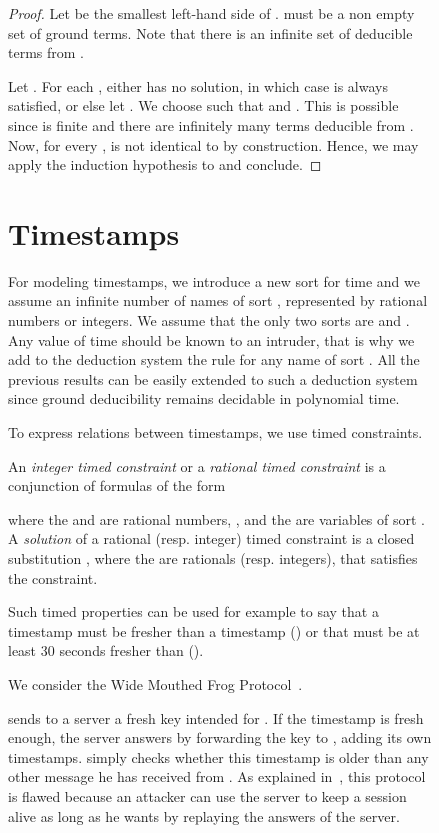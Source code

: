 \documentclass[acmtocl,acmnow]{acmtrans2m}
\begin{document}
\begin{figure}[t]
{{\begin{proof}
Let  be the smallest left-hand
side of .  must be a non empty set of ground terms. Note that there is
an infinite set of deducible terms from .


Let . For each , either  has no solution,
in which case  is always satisfied, or else let .  We choose  such that
 and . This is possible since  is finite and there are
infinitely many terms deducible from . Now, for every ,
 is not identical to  by
construction. Hence, we may apply the induction hypothesis to
 and conclude.
\end{proof}


\section{Timestamps}\label{sec:timestamps}
For modeling timestamps, we introduce a new sort  for time and we assume an infinite number of names of sort
, represented by rational numbers or integers. We assume that the only two sorts are  and
. Any value of
time should be known to an intruder, that is why we add to the
deduction system the rule {\small}
for any name  of sort . All the previous results
can be easily extended to such a deduction system since ground
deducibility remains decidable in polynomial time.




To express relations between timestamps, we use timed constraints. 
\begin{definition}
An \emph{integer timed constraint} or a
\emph{rational timed constraint}  is a conjunction of formulas of the form

where the  and  are rational numbers, , and the  are variables
of sort . A \emph{solution} of a rational (resp. integer) timed constraint  is a closed
substitution , where the  are rationals (resp.
integers), that satisfies the constraint.
\end{definition}




Such timed properties can be used for example to say that a
timestamp  must be fresher than a timestamp  () or that  must be at least 30 seconds fresher than
 ().


\begin{example}
We consider the Wide Mouthed Frog Protocol~\cite{CJ97}.

 sends to a server  a fresh key  intended for . If the timestamp  is fresh enough, the
server answers by forwarding the key to , adding its own timestamps.  simply checks whether this
timestamp is older than any other message he has received from . As explained in~\cite{CJ97}, this
protocol is flawed because an attacker can use the server to keep a session alive as long as he wants by
replaying the answers of the server.


\end{example}}}
\end{figure}
\end{document}
